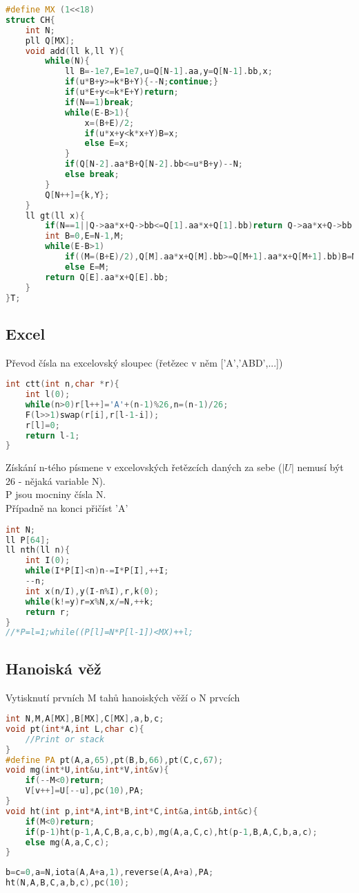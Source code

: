\documentclass[11pt]{article}
\begin{document}
\begin{lstlisting}[language=C++]
#define MX (1<<18)
struct CH{
    int N;
    pll Q[MX];
    void add(ll k,ll Y){
        while(N){
            ll B=-1e7,E=1e7,u=Q[N-1].aa,y=Q[N-1].bb,x;
            if(u*B+y>=k*B+Y){--N;continue;}
            if(u*E+y<=k*E+Y)return;
            if(N==1)break;
            while(E-B>1){
                x=(B+E)/2;
                if(u*x+y<k*x+Y)B=x;
                else E=x;
            }
            if(Q[N-2].aa*B+Q[N-2].bb<=u*B+y)--N;
            else break;
        }
        Q[N++]={k,Y};
    }
    ll gt(ll x){
        if(N==1||Q->aa*x+Q->bb<=Q[1].aa*x+Q[1].bb)return Q->aa*x+Q->bb;
        int B=0,E=N-1,M;
        while(E-B>1)
            if((M=(B+E)/2),Q[M].aa*x+Q[M].bb>=Q[M+1].aa*x+Q[M+1].bb)B=M;
            else E=M;
        return Q[E].aa*x+Q[E].bb;
    }
}T;
\end{lstlisting}
\subsection{Excel}
Převod čísla na excelovský sloupec (řetězec v něm ['A','ABD',...])
\begin{lstlisting}[language=C++]
int ctt(int n,char *r){
    int l(0);
    while(n>0)r[l++]='A'+(n-1)%26,n=(n-1)/26;
    F(l>>1)swap(r[i],r[l-1-i]);
    r[l]=0;
    return l-1;
}
\end{lstlisting}
Získání n-tého písmene v excelovských řetězcích daných za sebe ($|U|$ nemusí být 26 - nějaká variable \textsf{N}).
\\\textsf{P} jsou mocniny čísla \textsf{N}.
\\Případně na konci přičíst 'A'
\begin{lstlisting}[language=C++]
int N;
ll P[64];
ll nth(ll n){
    int I(0);
    while(I*P[I]<n)n-=I*P[I],++I;
    --n;
    int x(n/I),y(I-n%I),r,k(0);
    while(k!=y)r=x%N,x/=N,++k;
    return r;
}
//*P=l=1;while((P[l]=N*P[l-1])<MX)++l;
\end{lstlisting}
\subsection{Hanoiská věž}
Vytisknutí prvních \textsf{M} tahů hanoiských věží o \textsc{N} prvcích
\begin{lstlisting}[language=C++]
int N,M,A[MX],B[MX],C[MX],a,b,c;
void pt(int*A,int L,char c){
    //Print or stack
}
#define PA pt(A,a,65),pt(B,b,66),pt(C,c,67);
void mg(int*U,int&u,int*V,int&v){
    if(--M<0)return;
    V[v++]=U[--u],pc(10),PA;
}
void ht(int p,int*A,int*B,int*C,int&a,int&b,int&c){
    if(M<0)return;    
    if(p-1)ht(p-1,A,C,B,a,c,b),mg(A,a,C,c),ht(p-1,B,A,C,b,a,c);
    else mg(A,a,C,c);
}
\end{lstlisting}
\begin{lstlisting}[language=C++]
b=c=0,a=N,iota(A,A+a,1),reverse(A,A+a),PA;
ht(N,A,B,C,a,b,c),pc(10);
\end{lstlisting}
\end{document}
